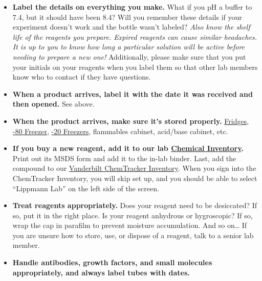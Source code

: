 \documentclass[
]{book}
\begin{document}
\begin{itemize}
\item
  \textbf{Label the details on everything you make.} What if you pH a buffer to 7.4, but it should have been 8.4? Will you remember these details if your experiment doesn't work and the bottle wasn't labeled? \emph{Also know the shelf life of the reagents you prepare. Expired reagents can cause similar headaches. It is up to you to know how long a particular solution will be active before needing to prepare a new one!} Additionally, please make sure that you put your initials on your reagents when you label them so that other lab members know who to contact if they have questions.
\item
  \textbf{When a product arrives, label it with the date it was received and then opened.} See above.
\item
  \textbf{When the product arrives, make sure it's stored properly.} \href{https://docs.google.com/spreadsheets/d/1t9L23HuwRWHOCMfKu_rz-U7EgKH5gI7dMqieAY7dIXQ/edit?usp=sharing}{Fridges}, \href{https://docs.google.com/spreadsheets/d/1ZrQVxXwKeqDFtX_aHHl4AUQASXxuAAL4-LCeeVI4ZxE/edit?usp=sharing}{-80 Freezer}, \href{https://docs.google.com/spreadsheets/d/1bH7JDGURGhdiMtvVTe1rEuFbch9wmwwFYO38IKKVyBw/edit?usp=sharing}{-20 Freezers}, flammables cabinet, acid/base cabinet, etc.
\item
  \textbf{If you buy a new reagent, add it to our lab \href{https://docs.google.com/spreadsheets/d/1sGEV2wA1jmqhkC78ZvBATzLQRgwiy3oQyAK6NWkWCLE/edit?usp=sharing}{Chemical Inventory}.} Print out its MSDS form and add it to the in-lab binder. Last, add the compound to our \href{https://vanderbilt.bioraft.com/}{Vanderbilt ChemTracker Inventory}. When you sign into the ChemTracker Inventory, you will skip set up, and you should be able to select ``Lippmann Lab'' on the left side of the screen.
\item
  \textbf{Treat reagents appropriately.} Does your reagent need to be desiccated? If so, put it in the right place. Is your reagent anhydrous or hygroscopic? If so, wrap the cap in parafilm to prevent moisture accumulation. And so on\ldots{} If you are unsure how to store, use, or dispose of a reagent, talk to a senior lab member.
\item
  \textbf{Handle antibodies, growth factors, and small molecules appropriately, and always label tubes with dates.}


\end{itemize}
\end{document}
